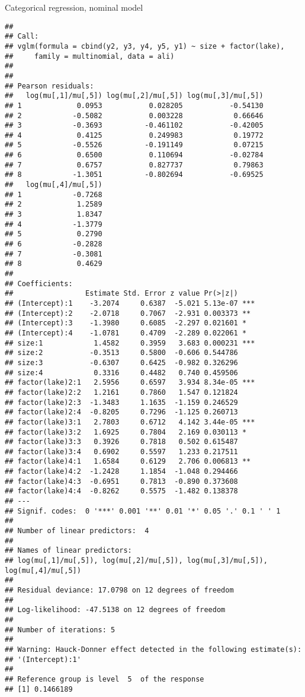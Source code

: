 \documentclass[ignorenonframetext,]{beamer}
\begin{document}
\begin{frame}[fragile]
\begin{block}{Categorical regression, nominal model}
\begin{verbatim}
## 
## Call:
## vglm(formula = cbind(y2, y3, y4, y5, y1) ~ size + factor(lake), 
##     family = multinomial, data = ali)
## 
## 
## Pearson residuals:
##   log(mu[,1]/mu[,5]) log(mu[,2]/mu[,5]) log(mu[,3]/mu[,5])
## 1             0.0953           0.028205           -0.54130
## 2            -0.5082           0.003228            0.66646
## 3            -0.3693          -0.461102           -0.42005
## 4             0.4125           0.249983            0.19772
## 5            -0.5526          -0.191149            0.07215
## 6             0.6500           0.110694           -0.02784
## 7             0.6757           0.827737            0.79863
## 8            -1.3051          -0.802694           -0.69525
##   log(mu[,4]/mu[,5])
## 1            -0.7268
## 2             1.2589
## 3             1.8347
## 4            -1.3779
## 5             0.2790
## 6            -0.2828
## 7            -0.3081
## 8             0.4629
## 
## Coefficients: 
##                 Estimate Std. Error z value Pr(>|z|)    
## (Intercept):1    -3.2074     0.6387  -5.021 5.13e-07 ***
## (Intercept):2    -2.0718     0.7067  -2.931 0.003373 ** 
## (Intercept):3    -1.3980     0.6085  -2.297 0.021601 *  
## (Intercept):4    -1.0781     0.4709  -2.289 0.022061 *  
## size:1            1.4582     0.3959   3.683 0.000231 ***
## size:2           -0.3513     0.5800  -0.606 0.544786    
## size:3           -0.6307     0.6425  -0.982 0.326296    
## size:4            0.3316     0.4482   0.740 0.459506    
## factor(lake)2:1   2.5956     0.6597   3.934 8.34e-05 ***
## factor(lake)2:2   1.2161     0.7860   1.547 0.121824    
## factor(lake)2:3  -1.3483     1.1635  -1.159 0.246529    
## factor(lake)2:4  -0.8205     0.7296  -1.125 0.260713    
## factor(lake)3:1   2.7803     0.6712   4.142 3.44e-05 ***
## factor(lake)3:2   1.6925     0.7804   2.169 0.030113 *  
## factor(lake)3:3   0.3926     0.7818   0.502 0.615487    
## factor(lake)3:4   0.6902     0.5597   1.233 0.217511    
## factor(lake)4:1   1.6584     0.6129   2.706 0.006813 ** 
## factor(lake)4:2  -1.2428     1.1854  -1.048 0.294466    
## factor(lake)4:3  -0.6951     0.7813  -0.890 0.373608    
## factor(lake)4:4  -0.8262     0.5575  -1.482 0.138378    
## ---
## Signif. codes:  0 '***' 0.001 '**' 0.01 '*' 0.05 '.' 0.1 ' ' 1
## 
## Number of linear predictors:  4 
## 
## Names of linear predictors: 
## log(mu[,1]/mu[,5]), log(mu[,2]/mu[,5]), log(mu[,3]/mu[,5]), log(mu[,4]/mu[,5])
## 
## Residual deviance: 17.0798 on 12 degrees of freedom
## 
## Log-likelihood: -47.5138 on 12 degrees of freedom
## 
## Number of iterations: 5 
## 
## Warning: Hauck-Donner effect detected in the following estimate(s):
## '(Intercept):1'
## 
## Reference group is level  5  of the response
## [1] 0.1466189
\end{verbatim}

\end{block}

\end{frame}
\end{document}
